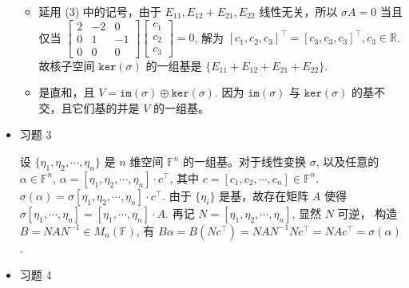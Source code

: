 \documentclass{article}
\begin{document}
\begin{spacing}{1.5}
\begin{itemize}
\begin{itemize}
            \item [(4)] 延用 (3) 中的记号，由于 $E_{11}, E_{12} + E_{21}, E_{22}$ 线性无关，所以 $\sigma A = 0$ 当且仅当 $\left[\begin{array}{ccc}2&-2&0\\0&1&-1\\0&0&0\end{array}\right] \left[\begin{array}{c}c_1\\c_2\\c_3\end{array}\right] = 0$, 解为 $[c_1, c_2, c_3]^\top = [c_3, c_3, c_3]^\top, c_3\in\mathbb{R}$. 故核子空间 $\mathtt{ker}(\sigma)$ 的一组基是 $\{E_{11} + E_{12} + E_{21} + E_{22}\}$.
            \item [(5)] 是直和，且 $V = \mathtt{im}(\sigma) \oplus \mathtt{ker}(\sigma)$. 因为 $\mathtt{im} (\sigma)$ 与 $\mathtt{ker}(\sigma)$ 的基不交，且它们基的并是 $V$ 的一组基。
        \end{itemize}

    \item [2.] 习题 3
    
    设 $\{\eta_1, \eta_2, \cdots, \eta_n\}$ 是 $n$ 维空间 $\mathbb{F}^{n}$ 的一组基。对于线性变换 $\sigma$, 以及任意的 $\alpha\in \mathbb{F}^n$, $\alpha = [\eta_1, \eta_2, \cdots, \eta_n]\cdot c^\top$, 其中 $c = [c_1, c_2, \cdots, c_n] \in\mathbb{F}^n$. $\sigma(\alpha) = \sigma [\eta_1, \eta_2, \cdots, \eta_n]\cdot c^\top$. 由于 $\{\eta_i\}$ 是基，故存在矩阵 $A$ 使得 $\sigma [\eta_1, \cdots, \eta_n] = [\eta_1, \cdots, \eta_n] \cdot A$. 再记 $N = [\eta_1, \eta_2, \cdots, \eta_n]$, 显然 $N$ 可逆， 构造 $B = NAN^{-1}\in M_n(\mathbb{F})$, 有 $B\alpha = B(Nc^\top) = NAN^{-1}Nc^\top = NAc^\top = \sigma(\alpha)$.

    \item [3.] 习题 4
    

\end{itemize}
\end{spacing}
\end{document}

